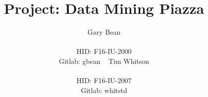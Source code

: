 \documentclass{sig-alternate}
\begin{document}
%

\title{Project: Data Mining Piazza}
%
%
%
%
%

%
\author{
%
%
\alignauthor
Gary Bean \\
    \\
    HID: F16-IU-2000\\
    Gitlab: gbean
    \
\alignauthor
Tim Whitson \\
    \\
    HID: F16-IU-2007\\
    Gitlab: whitstd
}
\end{document}
